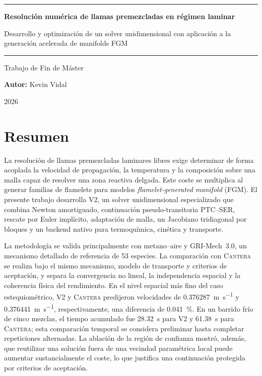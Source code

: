 \documentclass[12pt,a4paper,twoside,openany]{book}
\newcommand{\Vdos}{\textsc{V2}\xspace}
\newcommand{\Cantera}{\textsc{Cantera}\xspace}
\begin{document}
\hypersetup{pageanchor=false}

\begin{titlepage}
  \centering
  \vspace*{1.8cm}
  \rule{0.88\textwidth}{0.6pt}\par
  \vspace{0.65cm}
  {\LARGE\bfseries Resolución numérica de llamas premezcladas en régimen laminar\par}
  \vspace{0.45cm}
  {\Large Desarrollo y optimización de un solver unidimensional con aplicación a la generación acelerada de manifolds FGM\par}
  \vspace{0.65cm}
  \rule{0.88\textwidth}{0.6pt}\par
  \vfill
  {\large Trabajo de Fin de Máster\par}
  \vfill
  {\large\textbf{Autor:} Kevin Vidal\par}
  \vfill
  {\large 2026\par}
\end{titlepage}

\cleardoublepage
{}
\hypersetup{pageanchor=true}
\chapter*{Resumen}
La resolución de llamas premezcladas laminares libres exige determinar de forma
acoplada la velocidad de propagación, la temperatura y la composición sobre una
malla capaz de resolver una zona reactiva delgada. Este coste se multiplica al
generar familias de flamelets para modelos \emph{flamelet-generated manifold}
(FGM). El presente trabajo desarrolla \Vdos, un solver unidimensional
especializado que combina Newton amortiguado, continuación pseudo-transitoria
PTC--SER, rescate por Euler implícito, adaptación de malla, un Jacobiano
tridiagonal por bloques y un backend nativo para termoquímica, cinética y
transporte.

La metodología se valida principalmente con metano--aire y GRI-Mech~3.0, un
mecanismo detallado de referencia de 53 especies. La comparación con \Cantera
se realiza bajo el mismo mecanismo, modelo de transporte y criterios de
aceptación, y separa la convergencia no lineal, la independencia espacial y la
coherencia física del rendimiento. En el nivel espacial más fino del caso
estequiométrico, \Vdos y \Cantera predijeron velocidades de
\SI{0.376287}{\metre\per\second} y \SI{0.376441}{\metre\per\second},
respectivamente, una diferencia de \SI{0.041}{\percent}. En un barrido frío de
cinco mezclas, el tiempo acumulado fue \SI{28.32}{\second} para \Vdos y
\SI{61.38}{\second} para \Cantera; esta comparación temporal se considera
preliminar hasta completar repeticiones alternadas. La ablación de la región de
confianza mostró, además, que reutilizar una solución fuera de una vecindad
paramétrica local puede aumentar sustancialmente el coste, lo que justifica una
continuación protegida por criterios de aceptación.
\end{document}

